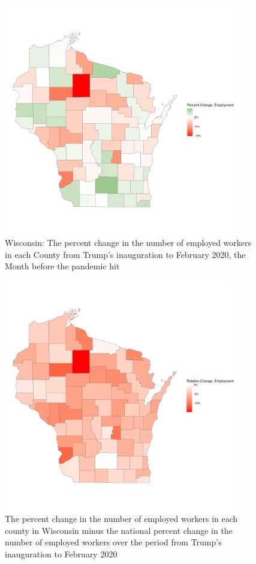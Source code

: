 \documentclass[11pt]{article}
\begin{document}
\begin{figure}
    \centering
    \includegraphics[width=0.9\textwidth]{plots/raw-employment-plot-wi.png}
    \caption{Wisconsin: The percent change in the number of employed workers in each County from Trump's inauguration to February 2020, the Month before the pandemic hit}
\end{figure}
\begin{figure}
    \centering
    \includegraphics[width=0.9\textwidth]{plots/relative-employment-plot-wi.png}
    \caption{The percent change in the number of employed workers in each county in Wisconsin minus the national percent change in the number of employed workers over the period from Trump's inauguration to February 2020}
\end{figure}
\end{document}
